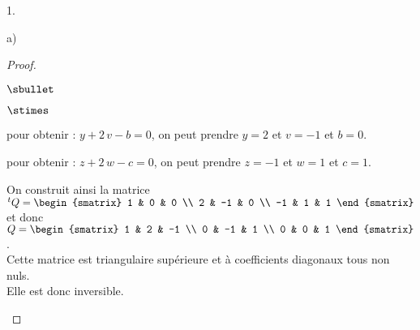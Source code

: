 \documentclass[11pt]{article}%
\begin{document}
\begin{noliste}{1.}
\begin{noliste}{a)}
\begin{proof}
\begin{noliste}{$\sbullet$}
\begin{noliste}{$\stimes$}
        \item pour obtenir : $y + 2 \, v - b = 0$, on peut prendre $y
          = 2$ et $v = -1$ et $b = 0$.

        \item pour obtenir : $z + 2 \, w - c = 0$, on peut prendre $z
          = -1$ et $w = 1$ et $c = 1$.      
        \end{noliste}
        On construit ainsi la matrice ${}^tQ =
        \begin{smatrix}
          1 & 0 & 0 \\
          2 & -1 & 0 \\
          -1 & 1 & 1 
        \end{smatrix}$ et donc $Q =         
        \begin{smatrix}
          1 & 2 & -1 \\
          0 & -1 & 1 \\
          0 & 0 & 1
        \end{smatrix}$.\\
        Cette matrice est triangulaire supérieure et à coefficients
        diagonaux tous non nuls.\\
        Elle est donc inversible.
      \end{noliste}


      \newpage



\end{proof}
\end{noliste}
\end{noliste}
\end{document}
